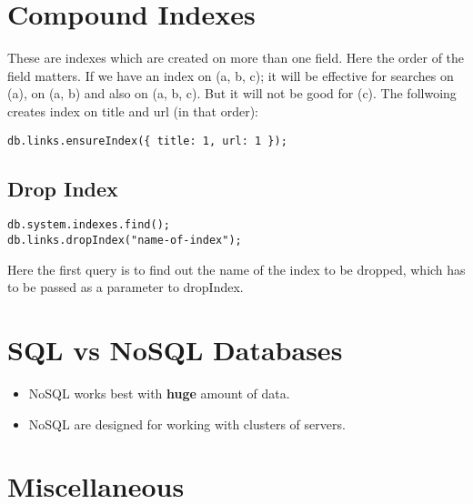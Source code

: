 \documentclass[a4paper, 12pt]{article}
\begin{document}
\section{Compound Indexes}
These are indexes which are created on more than one field. Here the order of the field matters. If we have an index on (a, b, c); it will be effective for searches on (a), on (a, b) and also on (a, b, c). But it will not be good for (c). The follwoing creates index on title and url (in that order):
\begin{verbatim}
db.links.ensureIndex({ title: 1, url: 1 });
\end{verbatim}
\subsection{Drop Index}
\begin{verbatim}
db.system.indexes.find();
db.links.dropIndex("name-of-index");
\end{verbatim}
Here the first query is to find out the name of the index to be dropped, which has to be passed as a parameter to dropIndex.

\section{SQL vs NoSQL Databases}
\begin{itemize}
	\item NoSQL works best with \textbf{huge} amount of data.
	\item NoSQL are designed for working with clusters of servers.
\end{itemize}

\section{Miscellaneous}
\end{document}
